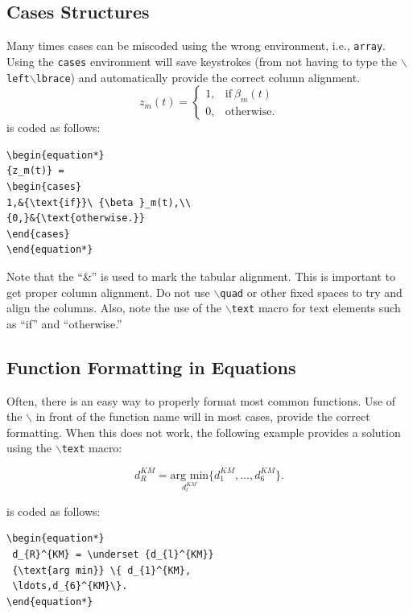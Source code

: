 \documentclass[lettersize,journal]{IEEEtran}
\begin{document}
\subsection{Cases Structures}
Many times cases can be miscoded using the wrong environment, i.e., {\tt{array}}. Using the {\tt{cases}} environment will save keystrokes (from not having to type the $\backslash${\tt{left}}$\backslash${\tt{lbrace}}) and automatically provide the correct column alignment.
\begin{equation*}
{z_m(t)} = \begin{cases}
1,&{\text{if}}\ {\beta }_m(t) \\ 
{0,}&{\text{otherwise.}} 
\end{cases}
\end{equation*}
\noindent is coded as follows:
\begin{verbatim}
\begin{equation*}
{z_m(t)} = 
\begin{cases}
1,&{\text{if}}\ {\beta }_m(t),\\ 
{0,}&{\text{otherwise.}} 
\end{cases}
\end{equation*}
\end{verbatim}
\noindent Note that the ``\&'' is used to mark the tabular alignment. This is important to get  proper column alignment. Do not use $\backslash${\tt{quad}} or other fixed spaces to try and align the columns. Also, note the use of the $\backslash${\tt{text}} macro for text elements such as ``if'' and ``otherwise.''

\subsection{Function Formatting in Equations}
Often, there is an easy way to properly format most common functions. Use of the $\backslash$ in front of the function name will in most cases, provide the correct formatting. When this does not work, the following example provides a solution using the $\backslash${\tt{text}} macro:

\begin{equation*} 
  d_{R}^{KM} = \underset {d_{l}^{KM}} {\text{arg min}} \{ d_{1}^{KM},\ldots,d_{6}^{KM}\}.
\end{equation*}

\noindent is coded as follows:
\begin{verbatim}
\begin{equation*} 
 d_{R}^{KM} = \underset {d_{l}^{KM}} 
 {\text{arg min}} \{ d_{1}^{KM},
 \ldots,d_{6}^{KM}\}.
\end{equation*}
\end{verbatim}
\end{document}
